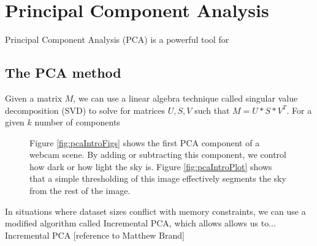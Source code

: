 %
\chapter{Principal Component Analysis}
\label{cpt:pca}

Principal Component Analysis (PCA) is a powerful tool for 

\section{The PCA method}

Given a matrix $M$, we can use a linear algebra technique called singular value decomposition (SVD) to solve for matrices $U, S, V$ such that $M = U * S * V^T.$  For a given $k$ number of components

\begin{figure}[ht]
	\centering
		\caption[Learning a sky mask for a webcam scene.]{Figure \ref{fig:pcaIntroFigs} shows the first PCA component of a webcam scene.  By adding or subtracting this component, we control how dark or how light the sky is. Figure \ref{fig:pcaIntroPlot} shows that a simple thresholding of this image effectively segments the sky from the rest of the image.}
\end{figure}

In situations where dataset sizes conflict with memory constraints, we can use a modified algorithm called Incremental PCA, which allows allows us to...  Incremental PCA [reference to Matthew Brand]